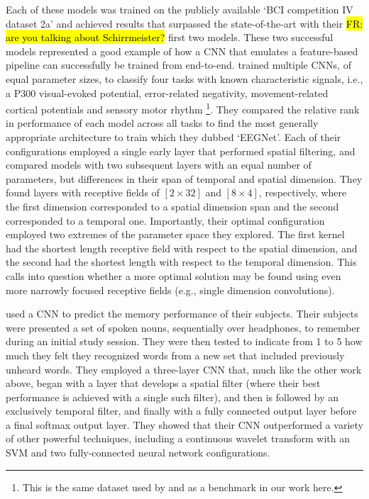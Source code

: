 \documentclass[utf8]{frontiersSCNS} %
\newcommand{\FR}[1]{{\small \textcolor{red}{\hl{FR: #1}}}}
\begin{document}
Each of these models was trained on the publicly available `BCI competition IV dataset 2a' and achieved results that surpassed the state-of-the-art with their \FR{are you talking about Schirrmeister?} first two models. These two successful models represented a good example of how a CNN that emulates a feature-based pipeline can successfully be trained from end-to-end. \cite{Lawhern2017} trained multiple CNNs, of equal parameter sizes, to classify four tasks with known characteristic signals, i.e., a P300 visual-evoked potential, error-related negativity, movement-related cortical potentials and sensory motor rhythm \footnote{This is the same dataset used by \cite{Schirrmeister2017} and as a benchmark in our work here.}. They compared the relative rank in performance of each model across all tasks to find the most generally appropriate architecture to train which they dubbed `EEGNet'. Each of their configurations employed a single early layer that performed spatial filtering, and compared models with two subsequent layers with an equal number of parameters, but differences in their span of temporal and spatial dimension. They found layers with receptive fields of $[2 \times 32]$ and $[8 \times 4]$, respectively, where the first dimension corresponded to a spatial dimension span and the second corresponded to a temporal one. Importantly, their optimal configuration employed two extremes of the parameter space they explored. The first kernel had the shortest length receptive field with respect to the spatial dimension, and the second had the shortest length with respect to the temporal dimension. This calls into question whether a more optimal solution may be found using even more narrowly focused receptive fields (e.g., single dimension convolutions).

\cite{Sun} used a CNN to predict the memory performance of their subjects. Their subjects were presented a set of spoken nouns, sequentially over headphones, to remember during an initial study session. They were then tested to indicate from 1 to 5 how much they felt they recognized words from a new set that included previously unheard words. They employed a three-layer CNN that, much like the other work above, began with a layer that develops a spatial filter (where their best performance is achieved with a single such filter), and then is followed by an exclusively temporal filter, and finally with a fully connected output layer before a final softmax output layer. They showed that their CNN outperformed a variety of other powerful techniques, including a continuous wavelet transform with an SVM and two fully-connected neural network configurations.
\end{document}
